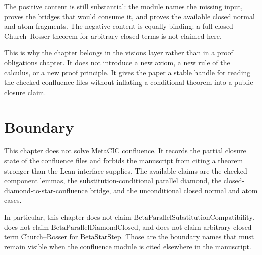 
The positive content is still substantial: the module names the missing input,
proves the bridges that would consume it, and proves the available closed
normal and atom fragments. The negative content is equally binding: a full
closed Church--Rosser theorem for arbitrary closed terms is not claimed here.

This is why the chapter belongs in the visions layer rather than in a proof
obligations chapter. It does not introduce a new axiom, a new rule of the
calculus, or a new proof principle. It gives the paper a stable handle for
reading the checked confluence files without inflating a conditional theorem
into a public closure claim.

\section{Boundary}
\label{sec:metacic-confluence-audit-map-boundary}

This chapter does not solve MetaCIC confluence. It records the partial closure
state of the confluence files and forbids the manuscript from citing a theorem
stronger than the Lean interface supplies. The available claims are the
checked component lemmas, the substitution-conditional parallel diamond, the
closed-diamond-to-star-confluence bridge, and the unconditional closed normal
and atom cases.

In particular, this chapter does not claim
$\mathrm{BetaParallelSubstitutionCompatibility}$, does not claim
$\mathrm{BetaParallelDiamondClosed}$, and does not claim arbitrary closed-term
Church--Rosser for $\mathrm{BetaStarStep}$. Those are the boundary names that
must remain visible when the confluence module is cited elsewhere in the
manuscript.

